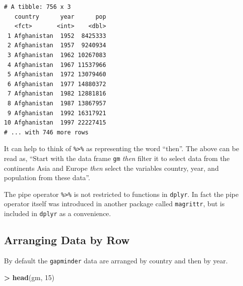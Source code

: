 \documentclass[]{krantz}
\makeatletter
\newenvironment{Shaded}{\begin{snugshade}}{\end{snugshade}}
\newcommand{\KeywordTok}[1]{\textcolor[rgb]{0.27,0.27,0.27}{\textbf{#1}}}
\newcommand{\DecValTok}[1]{\textcolor[rgb]{0.06,0.06,0.06}{#1}}
\newcommand{\StringTok}[1]{\textcolor[rgb]{0.5,0.5,0.5}{#1}}
\newcommand{\OperatorTok}[1]{\textcolor[rgb]{0.43,0.43,0.43}{\textbf{#1}}}
\newcommand{\NormalTok}[1]{#1}
\newenvironment{kframe}{%
\medskip{}
\setlength{\fboxsep}{.8em}
 \def\at@end@of@kframe{}%
 \ifinner\ifhmode%
  \def\at@end@of@kframe{\end{minipage}}%
  \begin{minipage}{\columnwidth}%
 \fi\fi%
 \def\FrameCommand##1{\hskip\@totalleftmargin \hskip-\fboxsep
 \colorbox{shadecolor}{##1}\hskip-\fboxsep
     \hskip-\linewidth \hskip-\@totalleftmargin \hskip\columnwidth}%
 \MakeFramed {\advance\hsize-\width
   \@totalleftmargin\z@ \linewidth\hsize
   \@setminipage}}%
 {\par\unskip\endMakeFramed%
 \at@end@of@kframe}
\renewenvironment{Shaded}{\begin{kframe}}{\end{kframe}}
\makeatother
\begin{document}
\begin{Shaded}
\end{Shaded}

\begin{verbatim}
# A tibble: 756 x 3
   country      year      pop
   <fct>       <int>    <dbl>
 1 Afghanistan  1952  8425333
 2 Afghanistan  1957  9240934
 3 Afghanistan  1962 10267083
 4 Afghanistan  1967 11537966
 5 Afghanistan  1972 13079460
 6 Afghanistan  1977 14880372
 7 Afghanistan  1982 12881816
 8 Afghanistan  1987 13867957
 9 Afghanistan  1992 16317921
10 Afghanistan  1997 22227415
# ... with 746 more rows
\end{verbatim}

It can help to think of \texttt{\%\textgreater{}\%} as representing the
word ``then''. The above can be read as, ``Start with the data frame
\texttt{gm} \emph{then} filter it to select data from the continents
Asia and Europe \emph{then} select the variables country, year, and
population from these data''.

The pipe operator \texttt{\%\textgreater{}\%} is not restricted to
functions in \texttt{dplyr}. In fact the pipe operator itself was
introduced in another package called \texttt{magrittr}, but is included
in \texttt{dplyr} as a convenience.

\subsection{Arranging Data by Row}\label{arranging-data-by-row}

By default the \texttt{gapminder} data are arranged by country and then
by year.

\begin{Shaded}
\begin{Highlighting}[]
\OperatorTok{>}\StringTok{ }\KeywordTok{head}\NormalTok{(gm, }\DecValTok{15}\NormalTok{)}
\end{Highlighting}
\end{Shaded}
\end{document}
